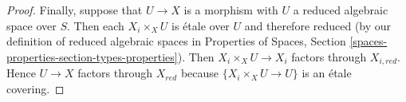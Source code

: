 \documentclass{stacks-project}
\theoremstyle{plain}
\theoremstyle{definition}
\theoremstyle{remark}
\numberwithin{equation}{subsection}
\begin{document}
\begin{proof}
\medskip\noindent
Finally, suppose that $U \to X$ is a morphism with
$U$ a reduced algebraic space over $S$. Then each $X_i \times_X U$
is \'etale over $U$ and therefore reduced (by our definition of
reduced algebraic spaces in Properties of Spaces, Section
\ref{spaces-properties-section-types-properties}).
Then $X_i \times_X U \to X_i$ factors through $X_{i, red}$.
Hence $U \to X$ factors through $X_{red}$ because
$\{X_i \times_X U \to U\}$ is an \'etale covering.
\end{proof}
\end{document}
